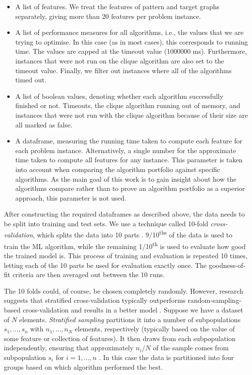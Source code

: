 \documentclass{l4proj}
\theoremstyle{definition}
\theoremstyle{remark}
\begin{document}
\begin{itemize}
\item A list of features. We treat the features of pattern and target graphs
  separately, giving more than 20 features per problem instance.
\item A list of performance measures for all algorithms, i.e., the values that
  we are trying to optimise. In this case (as in most cases), this corresponds
  to running time. The values are capped at the timeout value (\num{1000000} ms).
  Furthermore, instances that were not run on the clique algorithm are also set
  to the timeout value. Finally, we filter out instances where all of the
  algorithms timed out.
\item A list of boolean values, denoting whether each algorithm successfully
  finished or not. Timeouts, the clique algorithm running out of memory, and
  instances that were not run with the clique algorithm because of their size
  are all marked as false.
\item A dataframe, measuring the running time taken to compute each feature for
  each problem instance. Alternatively, a single number for the approximate time
  taken to compute all features for any instance. This parameter is taken into
  account when comparing the algorithm portfolio against specific algorithms. As
  the main goal of this work is to gain insight about how the algorithms compare
  rather than to prove an algorithm portfolio as a superior approach, this
  parameter is not used.
\end{itemize}

After constructing the required dataframes as described above, the data needs to
be split into training and test sets. We use a technique called 10-fold
\emph{cross-validation}, which splits the data into 10 parts \cite{citeulike:1304145}.
9/10\textsuperscript{ths} of the data is used to train the ML algorithm, while
the remaining 1/10\textsuperscript{th} is used to evaluate how good the trained
model is. This process of training and evaluation is repeated 10 times, letting
each of the 10 parts be used for evaluation exactly once. The goodness-of-fit
criteria are then averaged out between the 10 runs.

The 10 folds could, of course, be chosen completely randomly. However, research
suggests that stratified cross-validation typically outperforms
random-sampling-based cross-validation and results in a better model
\cite{DBLP:conf/ijcai/Kohavi95}. Suppose we have a dataset of $N$ elements.
\emph{Stratified sampling} partitions it into a number of subpopulations $s_1,
\dots, s_n$ with $n_1, \dots, n_N$ elements, respectively (typically based on
the value of some feature or collection of features). It then draws from each
subpopulation independently, ensuring that approximately $n_i/N$ of the sample
comes from subpopulation $s_i$ for $i = 1, \dots, n$ \cite{lohr2009sampling}. In
this case the data is partitioned into four groups based on which algorithm
performed the best.
\end{document}
